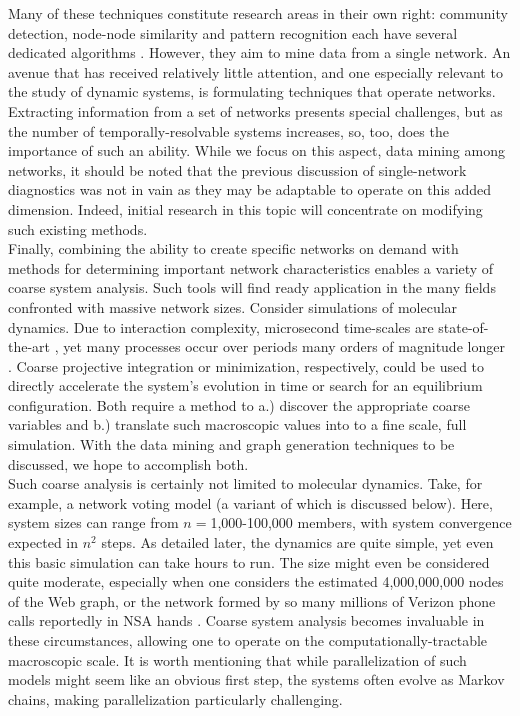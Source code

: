 \documentclass[11pt]{article}
\begin{document}
Many of these techniques constitute research areas in their own right: community detection, node-node similarity and pattern recognition each have several dedicated algorithms \cite{laZagerMIT} \cite{kleinberg} \cite{modularity} \cite{neuralnetwork pattern recog}. However, they aim to mine data from a single network. An avenue that has received relatively little attention, and one especially relevant to the study of dynamic systems, is formulating techniques that operate  networks. Extracting information from a set of networks presents special challenges, but as the number of temporally-resolvable systems increases, so, too, does the importance of such an ability. While we focus on this aspect, data mining among networks, it should be noted that the previous discussion of single-network diagnostics was not in vain as they may be adaptable to operate on this added dimension. Indeed, initial research in this topic will concentrate on modifying such existing methods. \vspace{1mm}\\
Finally, combining the ability to create specific networks on demand with methods for determining important network characteristics enables a variety of coarse system analysis. Such tools will find ready application in the many fields confronted with massive network sizes. Consider simulations of molecular dynamics. Due to interaction complexity, microsecond time-scales are state-of-the-art \cite{d.e.shaw}, yet many processes occur over periods many orders of magnitude longer \cite{glass equilibration} \cite{talk to elia again}. Coarse projective integration or minimization, respectively, could be used to directly accelerate the system's evolution in time or search for an equilibrium configuration. Both require a method to a.) discover the appropriate coarse variables and b.) translate such macroscopic values into to a fine scale, full simulation. With the data mining and graph generation techniques to be discussed, we hope to accomplish both. \vspace{1mm}\\
Such coarse analysis is certainly not limited to molecular dynamics. Take, for example, a network voting model (a variant of which is discussed below). Here, system sizes can range from $n=$1,000-100,000 members, with system convergence expected in $n^{2}$ steps. As detailed later, the dynamics are quite simple, yet even this basic simulation can take hours to run. The size might even be considered quite moderate, especially when one considers the estimated 4,000,000,000 nodes of the Web graph, or the network formed by so many millions of Verizon phone calls reportedly in NSA hands \cite{the web graph: an overview}. Coarse system analysis becomes invaluable in these circumstances, allowing one to operate on the computationally-tractable macroscopic scale. It is worth mentioning that while parallelization of such models might seem like an obvious first step, the systems often evolve as Markov chains, making parallelization particularly challenging.
\end{document}
